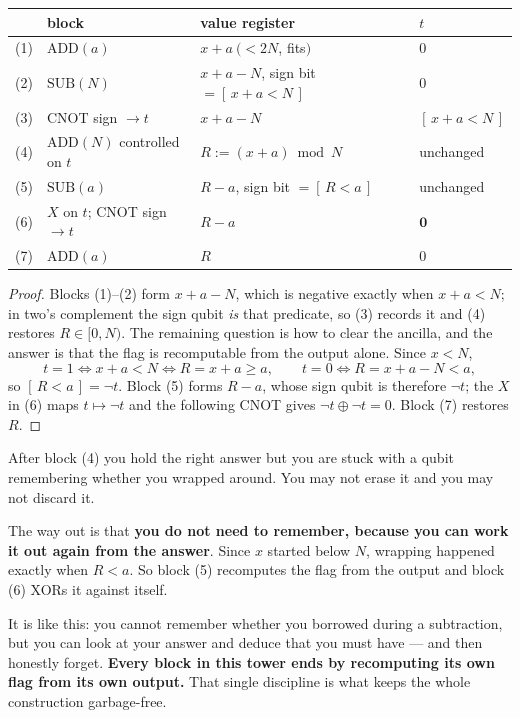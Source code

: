 \documentclass[11pt]{article}
\newcommand{\ADD}{\mathrm{ADD}}
\newcommand{\SUB}{\mathrm{SUB}}
\theoremstyle{plain}
\theoremstyle{remark}
\begin{document}
\medskip
\begin{center}
\begin{tabular}{@{}rlll@{}}
\toprule
& block & value register & $t$\\
\midrule
(1) & $\ADD(a)$ & $x+a\ (<2N$, fits$)$ & $0$\\
(2) & $\SUB(N)$ & $x+a-N$, sign bit $=[\,x+a<N\,]$ & $0$\\
(3) & CNOT sign $\to t$ & $x+a-N$ & $[\,x+a<N\,]$\\
(4) & $\ADD(N)$ controlled on $t$ & $R:=(x+a)\bmod N$ & unchanged\\
(5) & $\SUB(a)$ & $R-a$, sign bit $=[\,R<a\,]$ & unchanged\\
(6) & $X$ on $t$; CNOT sign $\to t$ & $R-a$ & $\mathbf 0$\\
(7) & $\ADD(a)$ & $R$ & $0$\\
\bottomrule
\end{tabular}
\end{center}

\begin{proof}
Blocks (1)--(2) form $x+a-N$, which is negative exactly when $x+a<N$; in two's complement the sign
qubit \emph{is} that predicate, so (3) records it and (4) restores $R\in[0,N)$. The remaining
question is how to clear the ancilla, and the answer is that the flag is recomputable from the
output alone. Since $x<N$,
\[
t=1\iff x+a<N\iff R=x+a\ge a,
\qquad
t=0\iff R=x+a-N<a,
\]
so $[\,R<a\,]=\neg t$. Block (5) forms $R-a$, whose sign qubit is therefore $\neg t$; the $X$ in (6)
maps $t\mapsto\neg t$ and the following CNOT gives $\neg t\oplus\neg t=0$. Block (7) restores $R$.
\end{proof}

\begin{keybox}[title={The idea: deduce the flag, don't remember it}]
After block (4) you hold the right answer but you are stuck with a qubit remembering whether you
wrapped around. You may not erase it and you may not discard it.

The way out is that \textbf{you do not need to remember, because you can work it out again from the
answer}. Since $x$ started below $N$, wrapping happened exactly when $R<a$. So block (5) recomputes
the flag from the output and block (6) XORs it against itself.

It is like this: you cannot remember whether you borrowed during a subtraction, but you can look at
your answer and deduce that you must have --- and then honestly forget. \textbf{Every block in this
tower ends by recomputing its own flag from its own output.} That single discipline is what keeps
the whole construction garbage-free.
\end{keybox}
\end{document}
